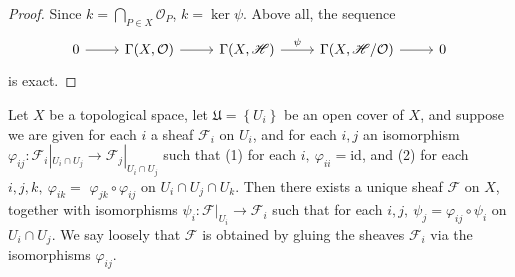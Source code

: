 \begin{proof}
	Since $k=\bigcap_{P\in X}\mathcal{O}_P$, $k=\ker\psi$. Above all, the sequence
	\begin{equation*}
		\begin{tikzcd}
			0 \arrow[r] & {\Gamma(X,\mathcal{O})} \arrow[r] & {\Gamma(X,\mathscr{H})} \arrow[r, "\psi"] & {\Gamma(X,\mathscr{H}/\mathcal{O})} \arrow[r] & 0
		\end{tikzcd}
	\end{equation*}
	is exact.
\end{proof}
\begin{exe}
	\label{2.1.22}
	Let $X$ be a topological space, let $\mathfrak{U}=\left\{U_{i}\right\}$ be an open cover of $X$, and suppose we are given for each $i$ a sheaf $\mathscr{F}_{i}$ on $U_{i}$, and for each $i, j$ an isomorphism $\varphi_{i j}:\mathscr{F}_{i}|_{U_{i} \cap U_{j}} \rightarrow \mathscr{F}_{j}|_{U_{i} \cap U_{j}}$ such that
	(1) for each $i,\ \varphi_{i i}=\mathrm{id}$, and
	(2) for each $i, j, k,\ \varphi_{i k}=$ $\varphi_{j k} \circ \varphi_{i j}$ on $U_{i} \cap U_{j} \cap U_{k} $. Then there exists a unique sheaf $\mathscr{F}$ on $X$, together with isomorphisms $\psi_{i}:\mathscr{F}|_{U_{i}} \rightarrow \mathscr{F}_{i}$ such that for each $i, j,\ \psi_{j}=\varphi_{i j} \circ \psi_{i}$ on $U_{i} \cap U_{j}$. We say loosely that $\mathscr{F}$ is
	obtained by gluing the sheaves $\mathscr{F}_{i}$ via the isomorphisms $\varphi_{i j}$.
\end{exe}
